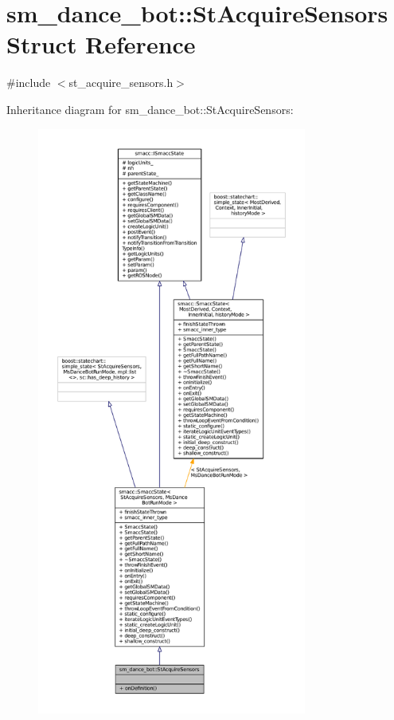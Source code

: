 \hypertarget{structsm__dance__bot_1_1StAcquireSensors}{}\section{sm\+\_\+dance\+\_\+bot\+:\+:St\+Acquire\+Sensors Struct Reference}
\label{structsm__dance__bot_1_1StAcquireSensors}


{\ttfamily \#include $<$st\+\_\+acquire\+\_\+sensors.\+h$>$}



Inheritance diagram for sm\+\_\+dance\+\_\+bot\+:\+:St\+Acquire\+Sensors\+:
\nopagebreak
\begin{figure}[H]
\begin{center}
\leavevmode
\includegraphics[height=550pt]{structsm__dance__bot_1_1StAcquireSensors__inherit__graph}
\end{center}
\end{figure}


